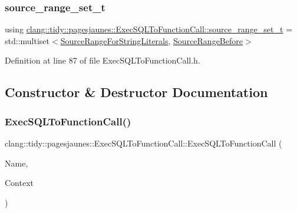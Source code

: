 \subsubsection{\texorpdfstring{source\+\_\+range\+\_\+set\+\_\+t}{source\_range\_set\_t}}
{\footnotesize\ttfamily using \hyperlink{classclang_1_1tidy_1_1pagesjaunes_1_1_exec_s_q_l_to_function_call_a23b8970bef757bb65d77350ae5245ed4}{clang\+::tidy\+::pagesjaunes\+::\+Exec\+S\+Q\+L\+To\+Function\+Call\+::source\+\_\+range\+\_\+set\+\_\+t} =  std\+::multiset$<$\hyperlink{classclang_1_1tidy_1_1pagesjaunes_1_1_exec_s_q_l_to_function_call_1_1_source_range_for_string_literals}{Source\+Range\+For\+String\+Literals}, \hyperlink{classclang_1_1tidy_1_1pagesjaunes_1_1_exec_s_q_l_to_function_call_1_1_source_range_before}{Source\+Range\+Before}$>$}



Definition at line 87 of file Exec\+S\+Q\+L\+To\+Function\+Call.\+h.



\subsection{Constructor \& Destructor Documentation}
\mbox{\label{classclang_1_1tidy_1_1pagesjaunes_1_1_exec_s_q_l_to_function_call_a75d4780b9a48eb91ed92fdde28a7214d}} 
\subsubsection{\texorpdfstring{Exec\+S\+Q\+L\+To\+Function\+Call()}{ExecSQLToFunctionCall()}}
{\footnotesize\ttfamily clang\+::tidy\+::pagesjaunes\+::\+Exec\+S\+Q\+L\+To\+Function\+Call\+::\+Exec\+S\+Q\+L\+To\+Function\+Call (\begin{DoxyParamCaption}\item[{String\+Ref}]{Name,  }\item[{Clang\+Tidy\+Context $\ast$}]{Context }\end{DoxyParamCaption})}



